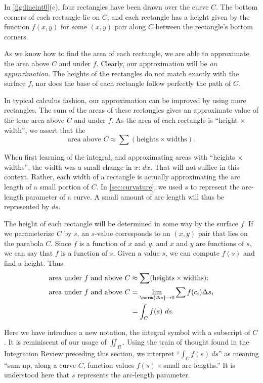 In \autoref{fig:lineint0}(c), four rectangles have been drawn over the curve $C$. The bottom corners of each rectangle lie on $C$, and each rectangle has a height given by the function $f(x,y)$ for some $(x,y)$ pair along $C$ between the rectangle's bottom corners. 

As we know how to find the area of each rectangle, we are able to approximate the area above $C$ and under $f$. Clearly, our approximation will be \emph{an approximation}. The heights of the rectangles do not match exactly with the surface $f$, nor does the base of each rectangle follow perfectly the path of $C$.

In typical calculus fashion, our approximation can be improved by using more rectangles. The sum of the areas of these rectangles gives an approximate value of the true area above $C$ and under $f$. As the area of each rectangle is ``height $\times$ width'', we assert that the
\[\text{area above $C$}\approx \sum (\text{heights}\times\text{widths}).\]

When first learning of the integral, and approximating areas with ``heights $\times$ widths'', the width was a small change in $x$: $dx$. That will not suffice in this context. Rather, each width of a rectangle is actually approximating the arc length of a small portion of $C$. In \autoref{sec:curvature}, we used $s$ to represent the arc-length parameter of a curve. A small amount of arc length will thus be represented by $ds$. 

The height of each rectangle will be determined in some way by the surface $f$. If we parameterize $C$ by $s$, an $s$-value corresponds to an $(x,y)$ pair that lies on the parabola $C$. Since $f$ is a function of $x$ and $y$, and $x$ and $y$ are functions of $s$, we can say that $f$ is a function of $s$. Given a value $s$, we can compute $f(s)$ and find a height. Thus
\begin{align}
	\text{area under $f$ and above $C$}
	&\approx \sum (\text{heights}\times\text{widths});\notag\\
	\text{area under $f$ and above $C$}
	&=\lim_{\norm{\Delta s}\to0}\sum f(c_i)\Delta s_i\notag\\
	&=\int_Cf(s)\ ds.\label{eq:line0}
\end{align}

Here we have introduce a new notation, the integral symbol with a subscript of $C$. It is reminiscent of our usage of $\iint_R$. Using the train of thought found in the Integration Review preceding this section, we interpret ``$\int_C f(s)\ ds$'' as meaning ``sum up, along a curve $C$, function values $f(s)\times$small arc lengths.'' It is understood here that $s$ represents the arc-length parameter.


